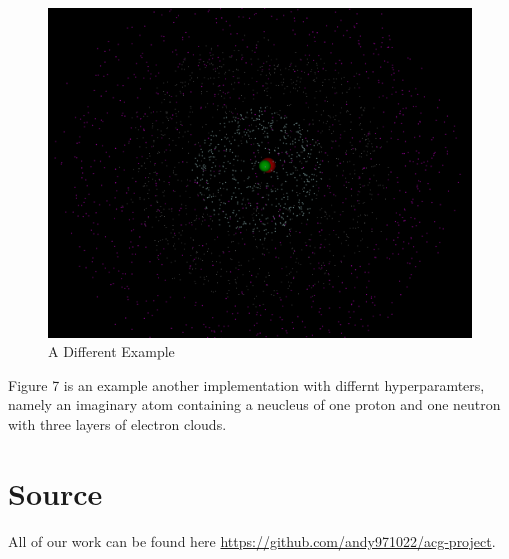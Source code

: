 \documentclass[acmtog]{acmart}
\begin{document}
\begin{figure}[h]
  \centering
  \includegraphics[width=\linewidth]{./example.png}
  \caption{A Different Example}
\end{figure}


Figure 7 is an example another implementation with differnt hyperparamters, namely an imaginary atom containing a neucleus of one proton and one neutron with three layers of electron clouds.

\section{Source}
All of our work can be found here \href{https://github.com/andy971022/acg-project}{https://github.com/andy971022/acg-project}.





\end{document}
